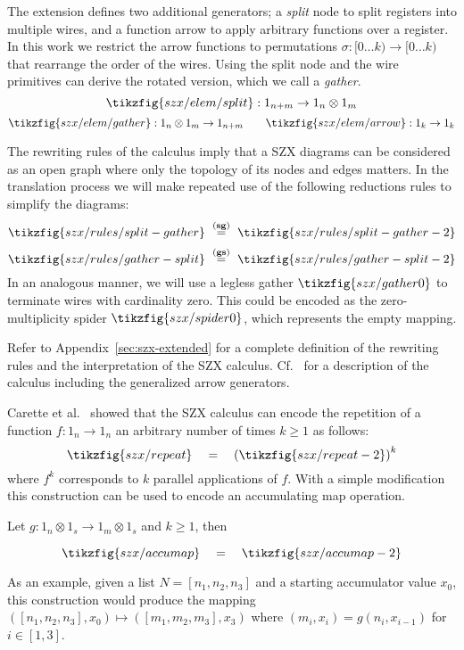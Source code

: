 The extension defines two additional generators; a \textit{split} node to split
registers into multiple wires, and a function arrow to apply arbitrary functions
over a register. In this work we restrict the arrow functions to permutations
$\sigma : [0 \dots k) \to [0 \dots k)$ that rearrange the order of the wires.
Using the split node and the wire primitives can derive the rotated version,
which we call a \textit{gather}.
\[
    \tikzfig{szx/elem/split} : 1_{n+m} \to 1_n \otimes 1_m
\]
\[
    \tikzfig{szx/elem/gather} : 1_n \otimes 1_m \to 1_{n+m}
    \qquad
    \tikzfig{szx/elem/arrow} : 1_k \to 1_k
\]

The rewriting rules of the calculus imply that a SZX diagrams can be considered
as an open graph where only the topology of its nodes and edges matters.
%
In the translation process we will make repeated use of the following
reductions rules to simplify the diagrams:
\[
    \tikzfig{szx/rules/split-gather}
    \ \stackrel{\mathbf{(sg)}}{=}\ %
    \tikzfig{szx/rules/split-gather-2}
\]
\[
    \tikzfig{szx/rules/gather-split}
    \ \stackrel{\mathbf{(gs)}}{=}\ %
    \tikzfig{szx/rules/gather-split-2}
\]
In an analogous manner, we will use a legless gather $\tikzfig{szx/gather0}$ to terminate wires with cardinality zero.
This could be encoded as the zero-multiplicity spider $\tikzfig{szx/spider0}$, which represents the empty mapping.

Refer to Appendix~\ref{sec:szx-extended} for a complete definition
of the rewriting rules and the interpretation of the SZX calculus.
%
Cf.~\cite{carette_quantum_2021} for a description of the calculus including the generalized arrow generators.

Carette et al.~\cite{carette_quantum_2021} showed that the SZX calculus
can encode the repetition of a function $f : 1_n \to 1_n$ an arbitrary number of times $k\geq 1$ as follows:
\[
    \tikzfig{szx/repeat}
    \quad=\quad%
    \left(\tikzfig{szx/repeat-2}\right)^k
\]
where $f^k$ corresponds to $k$ parallel applications of $f$.
With a simple modification this construction can be used to encode an accumulating map operation.
\begin{lemma}%
    \label{lem:accumap}
    Let $g : 1_n \otimes 1_s \to 1_{m} \otimes 1_s$ and $k\geq 1$, then
    
    \begin{adjustbox}{width=\textwidth}
    $$
    \tikzfig{szx/accumap}
    \quad=\quad%
    \tikzfig{szx/accumap-2}
    $$
    \end{adjustbox}
\end{lemma}
As an example, given a list $N = [n_1, n_2, n_3]$ and a starting accumulator value $x_0$,
this construction would produce the mapping $([n_1, n_2, n_3], x_0) \mapsto ([m_1, m_2, m_3], x_3)$ where
$(m_i, x_i) = g(n_i, x_{i-1})$ for $i \in [1,3]$.

